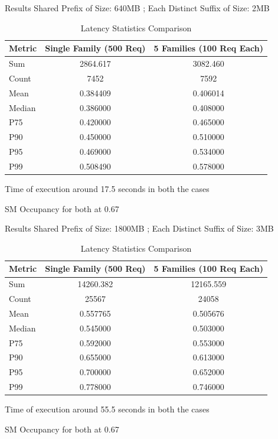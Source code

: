 \documentclass[Serif, 10pt, brown]{beamer}
\theoremstyle{example}
\theoremstyle{plain}
\begin{document}
\begin{frame}{Results}
    Shared Prefix of Size: 640MB ; Each Distinct Suffix of Size: 2MB
    \begin{table}[ht]
\centering
\begin{tabular}{lcc}
\hline
\textbf{Metric} & \textbf{Single Family (500 Req)} & \textbf{5 Families (100 Req Each)} \\
\hline
Sum     & 2864.617 & 3082.460 \\
Count   & 7452     & 7592     \\
Mean    & 0.384409 & 0.406014 \\
Median  & 0.386000 & 0.408000 \\
P75     & 0.420000 & 0.465000 \\
P90     & 0.450000 & 0.510000 \\
P95     & 0.469000 & 0.534000 \\
P99     & 0.508490 & 0.578000 \\
\hline
\end{tabular}
\caption{Latency Statistics Comparison}
\label{tab:latency_comparison}
\end{table}

Time of execution around 17.5 seconds in both the cases

SM Occupancy for both at 0.67
\end{frame}


\begin{frame}{Results}
    Shared Prefix of Size: 1800MB ; Each Distinct Suffix of Size: 3MB

    \begin{table}[ht]
\centering
\begin{tabular}{lcc}
\hline
\textbf{Metric} & \textbf{Single Family (500 Req)} & \textbf{5 Families (100 Req Each)} \\
\hline
Sum     & 14260.382 & 12165.559 \\
Count   & 25567    & 24058    \\
Mean    & 0.557765 & 0.505676 \\
Median  & 0.545000 & 0.503000 \\
P75     & 0.592000 & 0.553000 \\
P90     & 0.655000 & 0.613000 \\
P95     & 0.700000 & 0.652000 \\
P99     & 0.778000 & 0.746000 \\
\hline
\end{tabular}
\caption{Latency Statistics Comparison}
\label{tab:latency_comparison2}
\end{table}

Time of execution around 55.5 seconds in both the cases

SM Occupancy for both at 0.67
\end{frame}
\end{document}
